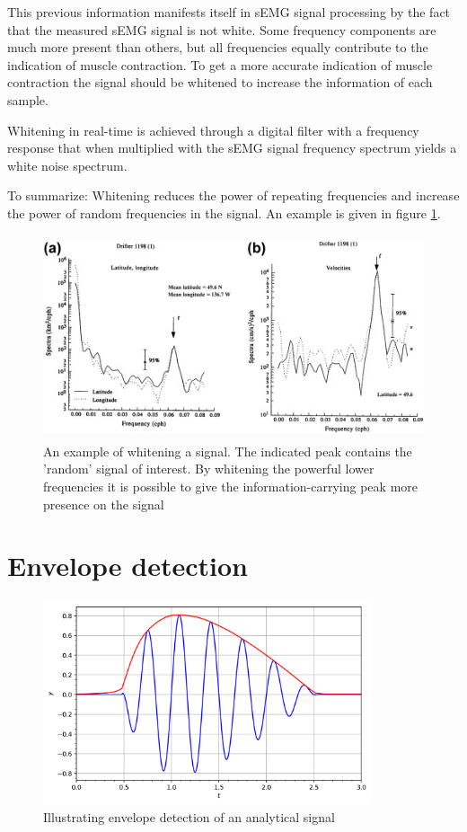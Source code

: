 This previous information manifests itself in sEMG signal processing by the fact that the measured sEMG signal is not white. Some frequency components are much more present than others, but all frequencies equally contribute to the indication of muscle contraction. To get a more accurate indication of muscle contraction the signal should be whitened to increase the information of each sample.

Whitening in real-time is achieved through a digital filter with a frequency response that when multiplied with the sEMG signal frequency spectrum yields a white noise spectrum.

To summarize: Whitening reduces the power of repeating frequencies and increase the power of random frequencies in the signal. An example is given in figure \ref{fig:whitening_example}.

\begin{figure}[h!t]
	\begin{center}
		\includegraphics[height=60mm]{images/prewhitening_example.jpg}
	\end{center}
	\caption{An example of whitening a signal. The indicated peak contains the 'random' signal of interest. By whitening the powerful lower frequencies it is possible to give the information-carrying peak more presence on the signal \cite{time_series_analysis_methods}}
	\label{fig:whitening_example}
\end{figure}


\section{Envelope detection}

\begin{figure}[h!t]
	\begin{center}
		\includegraphics[height=60mm]{images/envelope_wikipedia.png}
	\end{center}
	\caption{Illustrating envelope detection of an analytical signal \cite{envelope_wikipedia}}
	\label{fig:envelope_wikipedia}
\end{figure}

